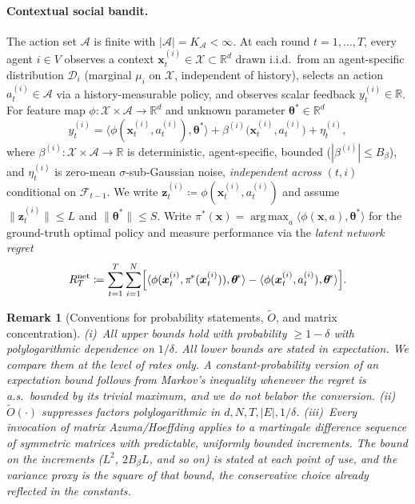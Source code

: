 \documentclass[11pt]{article}
\newtheorem{remark}[theorem]{Remark}
\DeclareMathOperator*{\argmax}{arg\,max}
\newcommand{\Ot}{\widetilde{O}}
\begin{document}
\paragraph{Contextual social bandit.}
The action set $\mathcal{A}$ is finite with $|\mathcal{A}|=K_{\mathcal{A}}<\infty$.
At each round $t=1,\dots,T$, every agent $i\in V$ observes a context
$\bm{x}_t^{(i)}\in\mathcal{X}\subset\mathbb{R}^d$ drawn i.i.d.\ from
an agent-specific distribution $\mathcal{D}_i$ (marginal $\mu_i$ on
$\mathcal{X}$, independent of history), selects an action
$a_t^{(i)}\in\mathcal{A}$ via a history-measurable policy, and
observes scalar feedback $y_t^{(i)}\in\mathbb{R}$.  For feature map
$\phi:\mathcal{X}\times\mathcal{A}\to\mathbb{R}^d$ and unknown
parameter $\bm{\theta}^{\!*}\in\mathbb{R}^d$ \begin{equation}
y_t^{(i)}=\langle\phi(\bm{x}_t^{(i)},a_t^{(i)}),\bm{\theta}^{\!*}\rangle
+\beta^{(i)}\!\bigl(\bm{x}_t^{(i)},a_t^{(i)}\bigr)+\eta_t^{(i)},
\label{eq:observation_model}
\end{equation}
where $\beta^{(i)}:\mathcal{X}\times\mathcal{A}\to\mathbb{R}$ is
deterministic, agent-specific, bounded ($|\beta^{(i)}|\leq B_\beta$),
and $\eta_t^{(i)}$ is zero-mean $\sigma$-sub-Gaussian noise,
\emph{independent across $(t,i)$} conditional on
$\mathcal{F}_{t-1}$.  We write
$\bm{z}_t^{(i)}\coloneqq\phi(\bm{x}_t^{(i)},a_t^{(i)})$ and assume
$\|\bm{z}_t^{(i)}\|\leq L$ and $\|\bm{\theta}^{\!*}\|\leq S$.
Write $\pi^{\!*}(\bm{x})=\argmax_a\langle\phi(\bm{x},a),\bm{\theta}^{\!*}\rangle$
for the ground-truth optimal policy and measure performance via the
\emph{latent network regret}
\begin{equation}
R_T^{\mathrm{net}}\coloneqq\sum_{t=1}^T\sum_{i=1}^N
\Bigl[\langle\phi(\bm{x}_t^{(i)},\pi^{\!*}(\bm{x}_t^{(i)})),\bm{\theta}^{\!*}\rangle
-\langle\phi(\bm{x}_t^{(i)},a_t^{(i)}),\bm{\theta}^{\!*}\rangle\Bigr].
\label{eq:latent_regret}
\end{equation}

\begin{remark}[Conventions for probability statements, $\Ot$, and matrix
concentration]\label{rem:conventions}
(i)~All upper bounds hold with probability $\geq1-\delta$ with
polylogarithmic dependence on $1/\delta$. All lower bounds are stated
in expectation.  We compare them at the level of rates only. A
constant-probability version of an expectation bound follows from
Markov's inequality whenever the regret is a.s.\ bounded by its
trivial maximum, and we do not belabor the conversion.
(ii)~$\Ot(\cdot)$ suppresses factors polylogarithmic in
$d,N,T,|E|,1/\delta$.
(iii)~Every invocation of matrix Azuma/Hoeffding \citep{tropp2012}
applies to a martingale difference sequence of symmetric matrices with
predictable, uniformly bounded increments. The bound on the increments
($L^2$, $2B_\beta L$, and so on) is stated at each point of use, and
the variance proxy is the square of that bound, the conservative
choice already reflected in the constants.
\end{remark}
\end{document}
